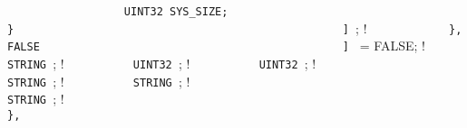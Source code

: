 {{\lstinline!                  UINT32 SYS_SIZE;                   ! \newline
\lstinline!                }                                    ! \newline
\lstinline!              ] !;            ! \newline
\lstinline!            },                                       ! \newline
\lstinline!            FALSE                                    ! \newline
\lstinline!          ] ! = FALSE;        ! \newline
\lstinline!                                                     ! \newline
\lstinline!          STRING !;             ! \newline
\lstinline!          UINT32 !;              ! \newline
\lstinline!          UINT32 !;   ! \newline
\lstinline!                                                     ! \newline
\lstinline!          STRING !;   ! \newline
\lstinline!          STRING !;   ! \newline
\lstinline!                                                     ! \newline
\lstinline!	     STRING !;       ! \newline
\lstinline!                                                     ! \newline
\lstinline!        },                                           ! \newline
}}
